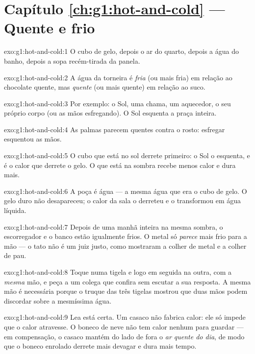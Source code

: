 \section*{Capítulo \ref{ch:g1:hot-and-cold} --- Quente e frio}

\begin{solution}{exo:g1:hot-and-cold:1}
O cubo de gelo, depois o ar do quarto, depois a água do banho, depois
a sopa recém-tirada da panela.
\end{solution}

\begin{solution}{exo:g1:hot-and-cold:2}
A água da torneira é \emph{fria} (ou mais fria) em relação ao
chocolate quente, mas \emph{quente} (ou mais quente) em relação ao
suco.
\end{solution}

\begin{solution}{exo:g1:hot-and-cold:3}
Por exemplo: o Sol, uma chama, um aquecedor, o seu próprio corpo (ou
as mãos esfregando). O Sol esquenta a praça inteira.
\end{solution}

\begin{solution}{exo:g1:hot-and-cold:4}
As palmas parecem quentes contra o rosto: esfregar esquentou as mãos.
\end{solution}

\begin{solution}{exo:g1:hot-and-cold:5}
O cubo que está no sol derrete primeiro: o Sol o esquenta, e é o
calor que derrete o gelo. O que está na sombra recebe menos calor e
dura mais.
\end{solution}

\begin{solution}{exo:g1:hot-and-cold:6}
A poça é água --- a mesma água que era o cubo de gelo. O gelo duro
não desapareceu; o calor da sala o derreteu e o transformou em água
líquida.
\end{solution}

\begin{solution}{exo:g1:hot-and-cold:7}
Depois de uma manhã inteira na mesma sombra, o escorregador e o banco
estão igualmente frios. O metal só \emph{parece} mais frio para a mão
--- o tato não é um juiz justo, como mostraram a colher de metal e a
colher de pau.
\end{solution}

\begin{solution}{exo:g1:hot-and-cold:8}
Toque numa tigela e logo em seguida na outra, com a \emph{mesma} mão,
e peça a um colega que confira sem escutar a sua resposta. A mesma
mão é necessária porque o truque das três tigelas mostrou que duas
mãos podem discordar sobre a mesmíssima água.
\end{solution}

\begin{solution}{exo:g1:hot-and-cold:9}
Lea está certa. Um casaco não fabrica calor: ele só impede que o
calor atravesse. O boneco de neve não tem calor nenhum para guardar
--- em compensação, o casaco mantém do lado de fora o \emph{ar quente
do dia}, de modo que o boneco enrolado derrete mais devagar e dura
mais tempo.
\end{solution}
